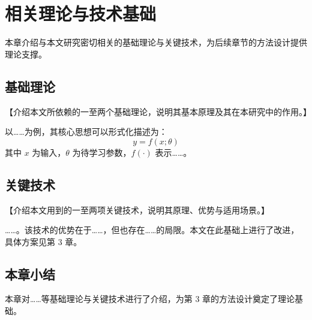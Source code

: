 \section{相关理论与技术基础}

本章介绍与本文研究密切相关的基础理论与关键技术，为后续章节的方法设计提供理论支撑。

\subsection{基础理论}

【介绍本文所依赖的一至两个基础理论，说明其基本原理及其在本研究中的作用。】

以……为例，其核心思想可以形式化描述为：
\begin{equation}
  y = f(x;\theta)
\end{equation}
其中 \(x\) 为输入，\(\theta\) 为待学习参数，\(f(\cdot)\) 表示……。

\subsection{关键技术}

【介绍本文用到的一至两项关键技术，说明其原理、优势与适用场景。】

……。该技术的优势在于……，但也存在……的局限。本文在此基础上进行了改进，具体方案见第 3 章。

\subsection{本章小结}

本章对……等基础理论与关键技术进行了介绍，为第 3 章的方法设计奠定了理论基础。

